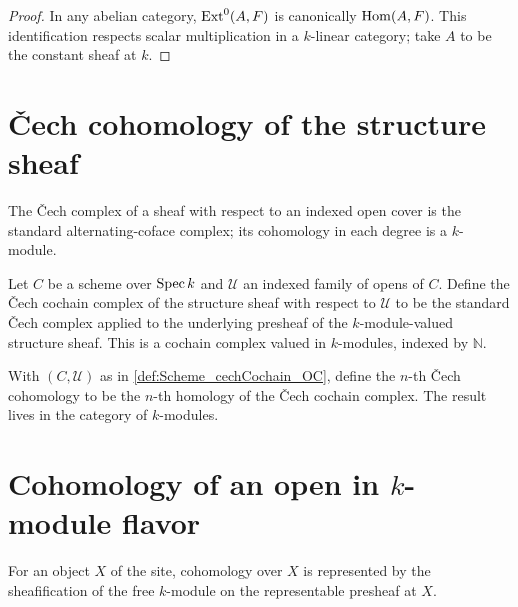 \begin{proof}
  
  \leanok
  In any abelian category, \(\operatorname{Ext}^0(A,F)\) is canonically \(\operatorname{Hom}(A,F)\). This identification respects scalar multiplication in a \(k\)-linear category; take \(A\) to be the constant sheaf at \(k\).
\end{proof}

\section{\v{C}ech cohomology of the structure sheaf}
\label{sec:moduleK_cech}

The \v{C}ech complex of a sheaf with respect to an indexed open cover is the standard alternating-coface complex; its cohomology in each degree is a \(k\)-module.

\begin{definition}\leanok
  \label{def:Scheme_cechCochain_OC}
  Let \(C\) be a scheme over \(\operatorname{Spec} k\) and \(\mathcal U\) an indexed family of opens of \(C\). Define the \v{C}ech cochain complex of the structure sheaf with respect to \(\mathcal U\) to be the standard \v{C}ech complex applied to the underlying presheaf of the \(k\)-module-valued structure sheaf. This is a cochain complex valued in \(k\)-modules, indexed by \(\mathbb N\).
\end{definition}

\begin{definition}\leanok
  \label{def:Scheme_cechCohomology_OC}
  With \((C, \mathcal U)\) as in \cref{def:Scheme_cechCochain_OC}, define the \(n\)-th \v{C}ech cohomology to be the \(n\)-th homology of the \v{C}ech cochain complex. The result lives in the category of \(k\)-modules.
\end{definition}

\section{Cohomology of an open in \(k\)-module flavor}
\label{sec:hmodule_prime}

For an object \(X\) of the site, cohomology over \(X\) is represented by the sheafification of the free \(k\)-module on the representable presheaf at \(X\).

